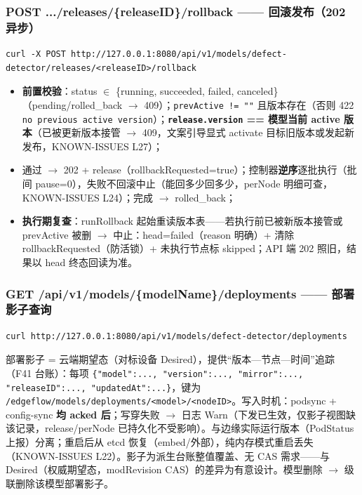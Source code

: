 \subsubsection{POST .../releases/\{releaseID\}/rollback —— 回滚发布（202 异步）}

\begin{lstlisting}
curl -X POST http://127.0.0.1:8080/api/v1/models/defect-detector/releases/<releaseID>/rollback
\end{lstlisting}

\begin{itemize}
  \item \textbf{前置校验}：status $\in$ \{running, succeeded, failed, canceled\}（pending/rolled\_back $\rightarrow$ 409）；\texttt{prevActive != ""} 且版本存在（否则 422 \texttt{no previous active version}）；\textbf{\texttt{release.version} == 模型当前 active 版本}（已被更新版本接管 $\rightarrow$ 409，文案引导显式 activate 目标旧版本或发起新发布，KNOWN-ISSUES L27）；
  \item 通过 $\rightarrow$ 202 + release（rollbackRequested=true）；控制器\textbf{逆序}逐批执行（批间 pause=0），失败不回滚中止（能回多少回多少，perNode 明细可查，KNOWN-ISSUES L24）；完成 $\rightarrow$ rolled\_back；
  \item \textbf{执行期复查}：runRollback 起始重读版本表——若执行前已被新版本接管或 prevActive 被删 $\rightarrow$ 中止：head=failed（reason 明确）+ 清除 rollbackRequested（防活锁）+ 未执行节点标 skipped；API 端 202 照旧，结果以 head 终态回读为准。
\end{itemize}

\subsubsection{GET /api/v1/models/\{modelName\}/deployments —— 部署影子查询}

\begin{lstlisting}
curl http://127.0.0.1:8080/api/v1/models/defect-detector/deployments
\end{lstlisting}

部署影子 = 云端期望态（对标设备 Desired），提供“版本—节点—时间”追踪（F41 台账）：每项 \texttt{\{"model":..., "version":..., "mirror":..., "releaseID":..., "updatedAt":...\}}，键为 \texttt{/edgeflow/models/deployments/<model>/<nodeID>}。写入时机：podsync + config-sync \textbf{均 acked 后}；写穿失败 $\rightarrow$ 日志 Warn（下发已生效，仅影子视图缺该记录，release/perNode 已持久化不受影响）。与边缘实际运行版本（PodStatus 上报）分离；重启后从 etcd 恢复（embed/外部），纯内存模式重启丢失（KNOWN-ISSUES L22）。影子为派生台账整值覆盖、无 CAS 需求——与 Desired（权威期望态，modRevision CAS）的差异为有意设计。模型删除 $\rightarrow$ 级联删除该模型部署影子。

